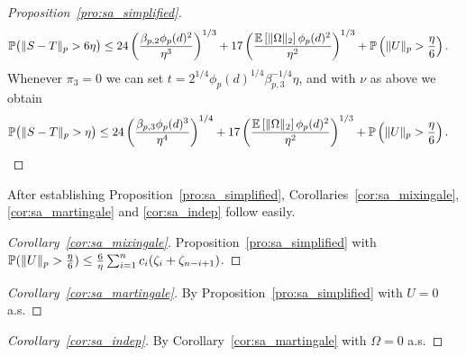 \begin{proof}[Proposition~\ref{pro:sa_simplified}]
\begin{align*}
    \P\big(\|S-T\|_p > 6\eta\big)
    &\leq
    24 \left(
      \frac{\beta_{p,2} \phi_p(d)^2}{\eta^3}
    \right)^{1/3}
    + 17 \left(
      \frac{\E \left[ \|\Omega\|_2 \right] \phi_p(d)^2}{\eta^2}
    \right)^{1/3}
    +\P\left(\|U\|_p>\frac{\eta}{6}\right).
  \end{align*}
  Whenever $\pi_3 = 0$ we can set
  $t = 2^{1/4} \phi_p(d)^{1/4} \beta_{p,3}^{-1/4} \eta$,
  and with $\nu$ as above we obtain
  \begin{align*}
    \P\big(\|S-T\|_p > \eta\big)
    &\leq
    24 \left(
      \frac{\beta_{p,3} \phi_p(d)^3}{\eta^4}
    \right)^{1/4}
    + 17 \left(
      \frac{\E \left[ \|\Omega\|_2 \right] \phi_p(d)^2}{\eta^2}
    \right)^{1/3}
    +\P\left(\|U\|_p>\frac{\eta}{6}\right).
  \end{align*}
\end{proof}

After establishing Proposition~\ref{pro:sa_simplified},
Corollaries~\ref{cor:sa_mixingale}, \ref{cor:sa_martingale}
and \ref{cor:sa_indep} follow easily.

\begin{proof}[Corollary~\ref{cor:sa_mixingale}]
  Proposition~\ref{pro:sa_simplified} with
  $\P ( \|U\|_p > \frac{\eta}{6} )
  \leq \frac{6}{\eta} \sum_{i=1}^{n} c_i (\zeta_{i} + \zeta_{n-i+1})$.
\end{proof}

\begin{proof}[Corollary~\ref{cor:sa_martingale}]
  By Proposition~\ref{pro:sa_simplified}
  with $U=0$ a.s.
\end{proof}

\begin{proof}[Corollary~\ref{cor:sa_indep}]
  By Corollary~\ref{cor:sa_martingale}
  with $\Omega=0$ a.s.
\end{proof}

